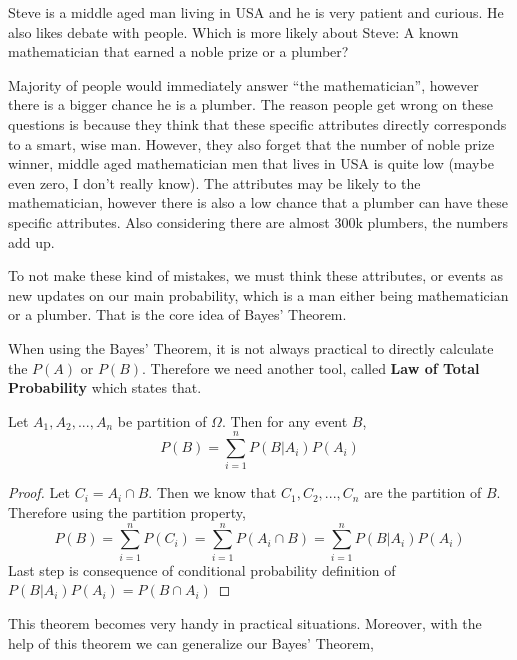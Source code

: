 \begin{example}
    Steve is a middle aged man  living in USA and he is very patient and curious. He also likes debate with people.  Which is more likely
    about Steve: A known mathematician that earned a noble prize or a plumber?
    \newline
    \par
    Majority of people would immediately answer ``the mathematician'', however there is a bigger chance he is a plumber. The reason people
    get wrong on these questions is because they think that these specific attributes directly corresponds to a smart, wise man. However,
    they also forget that the number of  noble prize winner, middle aged mathematician men that lives in USA is quite low (maybe even zero,
    I don't really know).
    The attributes may be likely to the mathematician, however there is also a low chance that a plumber can have these specific
    attributes. Also considering there are almost $300$k plumbers, the numbers add up.

    \par

    To not make these kind of mistakes, we must think these attributes, or events as new updates on our main probability, which is a man
    either being mathematician or a plumber. That is the core idea of Bayes' Theorem.
\end{example}

\par

When using the Bayes' Theorem, it is not always practical to directly calculate the $P(A)$ or $P(B)$. Therefore we need another tool,
called \textbf{Law of Total Probability} which states that.
\\
\begin{theorem} Let $A_1,A_2,...,A_n$ be partition of $\Omega$. Then for any event $B$,
    $$P(B)= \sum_{i=1}^n P(B|A_i)P(A_i)$$

\end{theorem}
\begin{proof}
    Let $C_i=A_i \cap B$. Then we know that $C_1,C_2,...,C_n$ are the partition of $B$. Therefore using the partition property,
    $$ P(B)= \sum_{i=1}^n P(C_i) = \sum_{i=1}^n P(A_i \cap B) =\sum_{i=1}^n P(B|A_i)P(A_i) $$
    Last step is consequence of conditional probability definition of $P(B|A_i)P(A_i)=P(B \cap A_i)$
\end{proof}

\par
This theorem becomes very handy in practical situations. Moreover, with the help of this theorem we can generalize our Bayes' Theorem,

